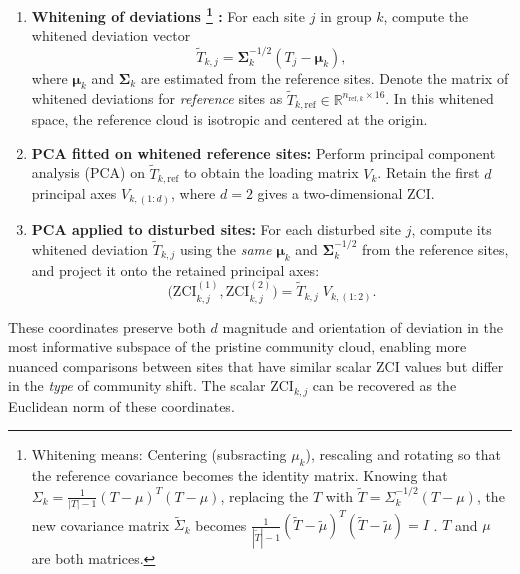 \begin{enumerate}
    \item \textbf{Whitening of deviations
    \footnote{Whitening means: Centering (subsracting \(\mu_k\)), rescaling and rotating so that the reference
    covariance becomes the identity matrix. Knowing that \(\Sigma_k = \frac{1}{|T|-1} (T - \mu)^T (T - \mu)\),
    replacing the \(T\) with \(\tilde{T} = \Sigma_k^{-1/2} (T - \mu)\),
    the new covariance matrix \(\tilde \Sigma_k\) becomes \(\frac{1}{|\tilde T| - 1} (\tilde{T} - \tilde \mu)^T (\tilde{T} - \tilde \mu) = I \) 
    . \(T\) and \(\mu\) are both matrices.}
    :} For each site $j$ in group $k$, compute the whitened deviation vector
    \[
    \tilde{T}_{k,j} = \boldsymbol{\Sigma}_k^{-1/2} (T_j - \boldsymbol{\mu}_k),
    \]
    where $\boldsymbol{\mu}_k$ and $\boldsymbol{\Sigma}_k$ are estimated from the reference sites.  
    Denote the matrix of whitened deviations for \emph{reference} sites as 
    $\tilde{T}_{k,\mathrm{ref}} \in \mathbb{R}^{n_{\mathrm{ref},k} \times 16}$.  
    In this whitened space, the reference cloud is isotropic and centered at the origin.
    
    \item \textbf{PCA fitted on whitened reference sites:}  
    Perform principal component analysis (PCA) on $\tilde{T}_{k,\mathrm{ref}}$ to obtain the loading matrix $V_k$.  
    Retain the first $d$ principal axes $V_{k,(1:d)}$, where $d=2$ gives a two-dimensional ZCI.

    \item \textbf{PCA applied to disturbed sites:}  
    For each disturbed site $j$, compute its whitened deviation $\tilde{T}_{k,j}$ using the \emph{same} $\boldsymbol{\mu}_k$ and $\boldsymbol{\Sigma}_k^{-1/2}$ from the reference sites, and project it onto the retained principal axes:
    \[
    \big( \mathrm{ZCI}^{(1)}_{k,j}, \mathrm{ZCI}^{(2)}_{k,j} \big)
    = \tilde{T}_{k,j} \; V_{k,(1:2)}.
    \]
\end{enumerate}

These coordinates preserve both $d$ magnitude and orientation of deviation in the most informative 
subspace of the pristine community cloud, enabling more nuanced comparisons between sites 
that have similar scalar ZCI values but differ in the \emph{type} of community shift.  
The scalar $\mathrm{ZCI}_{k,j}$ can be recovered as the Euclidean norm of these coordinates.

